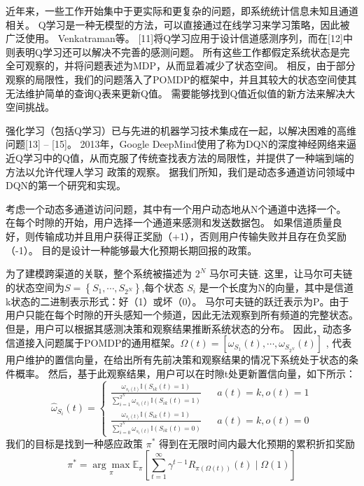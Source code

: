 近年来，一些工作开始集中于更实际和更复杂的问题，即系统统计信息未知且通道相关。 Q学习是一种无模型的方法，可以直接通过在线学习来学习策略，因此被广泛使用。 Venkatraman等。 [11]将Q学习应用于设计信道感测序列，而在[12]中则表明Q学习还可以解决不完善的感测问题。 所有这些工作都假定系统状态是完全可观察的，并将问题表述为MDP，从而显着减少了状态空间。 相反，由于部分观察的局限性，我们的问题落入了POMDP的框架中，并且其较大的状态空间使其无法维护简单的查询Q表来更新Q值。 需要能够找到Q值近似值的新方法来解决大空间挑战。

强化学习（包括Q学习）已与先进的机器学习技术集成在一起，以解决困难的高维问题[13] – [15]。 2013年，Google DeepMind使用了称为DQN的深度神经网络来逼近Q学习中的Q值，从而克服了传统查找表方法的局限性，并提供了一种端到端的方法以允许代理人学习 政策的观察。 据我们所知，我们是动态多通道访问领域中DQN的第一个研究和实现。

考虑一个动态多通道访问问题，其中有一个用户动态地从N个通道中选择一个。 在每个时隙的开始，用户选择一个通道来感测和发送数据包。 如果信道质量良好，则传输成功并且用户获得正奖励（+1），否则用户传输失败并且存在负奖励（-1）。 目的是设计一种能够最大化预期长期回报的政策。 

为了建模跨渠道的关联，整个系统被描述为 $2^{N}$ 马尔可夫链. 这里，让马尔可夫链的状态空间为$S=\left\{S_{1},\cdots,S_{2^{N}}\right\}$,每个状态 $S_{i}$  是一个长度为N的向量，其中是信道k状态的二进制表示形式：好（1）或坏（0）。
马尔可夫链的跃迁表示为P。由于用户只能在每个时隙的开头感知一个频道，因此无法观察到所有频道的完整状态。 但是，用户可以根据其感测决策和观察结果推断系统状态的分布。 因此，动态多信道接入问题属于POMDP的通用框架。$\Omega \left ( t \right )=\left [ \omega _{S_{1}} \left ( t \right ),\cdots,\omega _{S_{2^{N}}} \left ( t \right )\right ]$ , 代表用户维护的置信向量，在给出所有先前决策和观察结果的情况下系统处于状态的条件概率。
然后，基于此观察结果，用户可以在时隙t处更新置信向量，如下所示：
\begin{equation}\tag*{1}
\hat{\omega }_{S_{i}}\left ( t \right )=\left\{
\begin{aligned}
\frac{\omega _{s_{i}\left ( t \right )}\mathbb{I}\left ( S_{ik}\left ( t \right ) =1\right )}{\sum_{i=1}^{2^{N}}\omega _{s_{i}\left ( t \right )}\mathbb{I}\left ( S_{ik}\left ( t \right ) =1\right )}& & a(t)=k,o(t)=1\\
\frac{\omega _{s_{i}\left ( t \right )}\mathbb{I}\left ( S_{ik}\left ( t \right ) =1\right )}{\sum_{i=0}^{2^{N}}\omega _{s_{i}\left ( t \right )}\mathbb{I}\left ( S_{ik}\left ( t \right ) =0\right )}& & a(t)=k,o(t)=0
\end{aligned}
\right.
\end{equation}
我们的目标是找到一种感应政策 $\pi^{*}$ 得到在无限时间内最大化预期的累积折扣奖励
\begin{equation}\tag*{2}
\pi ^{*}= \underset{\pi }{\arg \max}\mathbb{E}_{\pi}\left [ \sum_{t=1}^{\infty }\gamma ^{t-1} R_{\pi\left ( \Omega \left ( t \right ) \right )}\left ( t \right )\mid \Omega \left ( 1 \right )\right ]
\end{equation}

